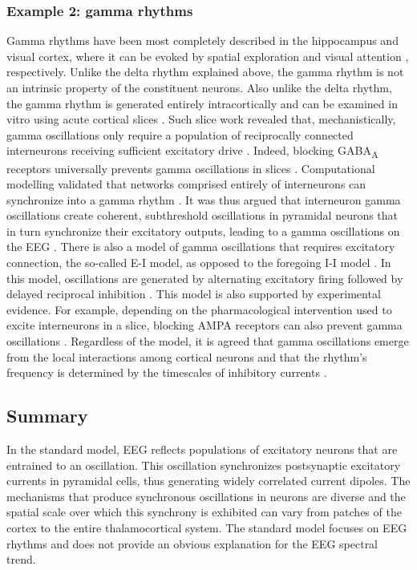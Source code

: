 \subsubsection{Example 2: gamma rhythms}
 Gamma rhythms have been most completely described in the hippocampus and visual cortex, where it can be evoked by spatial exploration \cite{Bragin1995} and visual attention \cite{Gray1989}, respectively. Unlike the delta rhythm explained above, the gamma rhythm is not an intrinsic property of the constituent neurons. Also unlike the delta rhythm, the gamma rhythm is generated entirely intracortically \cite{Gray1989} and can be examined in vitro using acute cortical slices \cite{Whittington1995}. Such slice work revealed that, mechanistically, gamma oscillations only require a population of reciprocally connected interneurons receiving sufficient excitatory drive \cite{Whittington1995, Buzski2012b}. Indeed, blocking GABA\textsubscript{A} receptors universally prevents gamma oscillations in slices \cite{Bartos2007}. Computational modelling validated that networks comprised entirely of interneurons can synchronize into a gamma rhythm \cite{Wang1996}. It was thus argued that interneuron gamma oscillations create coherent, subthreshold oscillations in pyramidal neurons that in turn synchronize their excitatory outputs, leading to a gamma oscillations on the EEG \cite{Wang1996}. There is also a model of gamma oscillations that requires excitatory connection, the so-called E-I model, as opposed to the foregoing I-I model \cite{Buzski2012b}. In this model, oscillations are generated by alternating excitatory firing followed by delayed reciprocal inhibition \cite{Borgers2003}. This model is also supported by experimental evidence. For example, depending on the pharmacological intervention used to excite interneurons in a slice, blocking AMPA receptors can also prevent gamma oscillations \cite{Bartos2007}. Regardless of the model, it is agreed that gamma oscillations emerge from the local interactions among cortical neurons and that the rhythm's frequency is determined by the timescales of inhibitory currents \cite{Bartos2007, Buzski2012b}.

\subsection{Summary}
In the standard model, EEG reflects populations of excitatory neurons that are entrained to an oscillation. This oscillation synchronizes postsynaptic excitatory currents in pyramidal cells, thus generating widely correlated current dipoles. The mechanisms that produce synchronous oscillations in neurons are diverse and the spatial scale over which this synchrony is exhibited can vary from patches of the cortex to the entire thalamocortical system. The standard model focuses on EEG rhythms and does not provide an obvious explanation for the EEG spectral trend.

